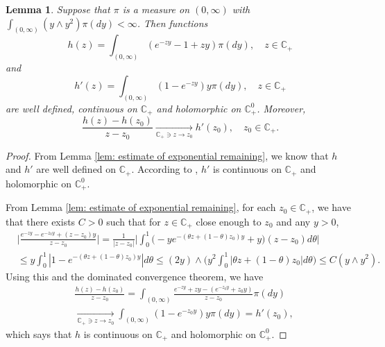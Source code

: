 \documentclass[12pt,a4paper]{amsart}
\theoremstyle{plain}
\newtheorem{lem}[thm]{Lemma}
\theoremstyle{definition}
\numberwithin{equation}{section}
\begin{document}
\begin{lem}
\label{lem: extension lemma for branching mechanism}
    Suppose that  $\pi$ is a measure on $(0,\infty)$ with $\int_{(0,\infty)} (y \wedge y^2) \pi(dy)< \infty$.
    Then functions
\begin{equation}
    h (z) = \int_{(0,\infty)} (e^{-zy} - 1 + zy) \pi(dy), \quad z \in \mathbb C_+
\end{equation}
and
\begin{equation}
\label{eq: deriavetive of the Poission partb}
    h'(z) = \int_{(0,\infty)}(1- e^{-zy})y \pi(dy), \quad z \in \mathbb C_+
\end{equation}
    are well defined, continuous on $\mathbb C_+$ and holomorphic on $\mathbb C_+^0$.
    Moreover,
\[
    \frac{h(z)-h(z_0)}{z-z_0} \xrightarrow[\mathbb C_+\ni z \to z_0]{} h'(z_0),\quad z_0 \in \mathbb C_+.
\]
\end{lem}
\begin{proof}
    From Lemma \ref{lem: estimate of exponential remaining}, we know that $h$ and $h'$ are well defined on $\mathbb C_+$.
    According to \cite[Theorem 3.2. \& Theorem 3.5]{SchillingSongVondracek2010Bernstein}, $h'$ is continuous on $\mathbb C_+$ and holomorphic on $\mathbb C_+^0$.

    From Lemma \ref{lem: estimate of exponential remaining}, for each $z_0 \in \mathbb C_+$, we have that there exists $C>0$ such that for $z \in \mathbb C_+$ close enough to $z_0$ and any
    $y>0$,
\begin{equation}\begin{split}
    &\Big| \frac{e^{-zy} - e^{-z_0 y}+(z-z_0) y}{z-z_0} \Big|
    = \frac{1}{|z-z_0|}\Big| \int_0^1 \big(-y e^{-(\theta z+(1-\theta)z_0)y}+y\big)(z-z_0)d\theta\Big|
    \\ &\leq y\int_0^1 |1-e^{-(\theta z +(1-\theta)z_0)y}| d\theta
    \leq (2y) \wedge\Big( y^2\int_0^1|\theta z+(1-\theta)z_0|d\theta\Big)
    \leq C(y\wedge y^2).
\end{split}\end{equation}
    Using this and the dominated convergence theorem, we have
\begin{equation}\begin{split}
    &\frac{h(z)-h(z_0)}{z-z_0} = \int_{(0,\infty)} \frac{e^{-zy}+zy -(e^{-z_0 y}+z_0 y)}{z-z_0}  \pi(dy)
    \\&\xrightarrow[\mathbb C_+\ni z\to z_0]{} \int_{(0,\infty)}(1 - e^{-z_0 y} )y\pi(dy) = h'(z_0),
\end{split}\end{equation}
    which says that $h$ is continuous on $\mathbb C_+$ and holomorphic on $\mathbb C_+^0$.
\end{proof}
\end{document}
